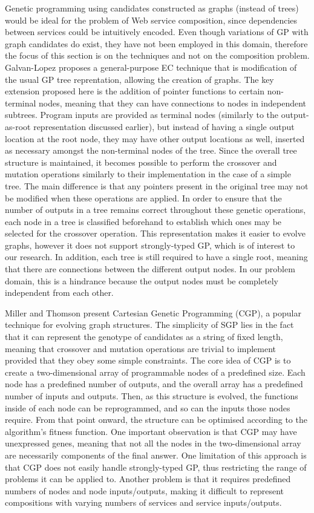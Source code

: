 Genetic programming using candidates constructed as graphs (instead of trees) would be ideal for the problem of Web service composition, since dependencies between services could be intuitively encoded. Even though variations of GP with graph candidates do exist, they have not been employed in this domain, therefore the focus of this section is on the techniques and not on the composition problem. Galvan-Lopez \cite{galvan2008efficient} proposes a general-purpose EC technique that is modification of the usual GP tree reprentation, allowing the creation of graphs. The key extension proposed here is the addition of pointer functions to certain non-terminal nodes, meaning that they can have connections to nodes in independent subtrees. Program inputs are provided as terminal nodes (similarly to the output-as-root representation discussed earlier), but instead of having a single output location at the root node, they may have other output locations as well, inserted as necessary amongst the non-terminal nodes of the tree. Since the overall tree structure is maintained, it becomes possible to perform the crossover and mutation operations similarly to their implementation in the case of a simple tree. The main difference is that any pointers present in the original tree may not be modified when these operations are applied. In order to ensure that the number of outputs in a tree remains correct throughout these genetic operations, each node in a tree is classified beforehand to establish which ones may be selected for the crossover operation. This representation makes it easier to evolve graphs, however it does not support strongly-typed GP, which is of interest to our research. In addition, each tree is still required to have a single root, meaning that there are connections between the different output nodes. In our problem domain, this is a hindrance because the output nodes must be completely independent from each other.

Miller and Thomson \cite{miller2000cartesian} present Cartesian Genetic Programming (CGP), a popular technique for evolving graph structures. The simplicity of SGP lies in the fact that it can represent the genotype of candidates as a string of fixed length, meaning that crossover and mutation operations are trivial to implement provided that they obey some simple constraints. The core idea of CGP is to create a two-dimensional array of programmable nodes of a predefined size. Each node has a predefined number of outputs, and the overall array has a predefined number of inputs and outputs. Then, as this structure is evolved, the functions inside of each node can be reprogrammed, and so can the inputs those nodes require. From that point onward, the structure can be optimised according to the algorithm's fitness function. One important observation is that CGP may have unexpressed genes, meaning that not all the nodes in the two-dimensional array are necessarily components of the final answer. One limitation of this approach is that CGP does not easily handle strongly-typed GP, thus restricting the range of problems it can be applied to. Another problem is that it requires predefined numbers of nodes and node inputs/outputs, making it difficult to represent compositions with varying numbers of services and service inputs/outputs.

